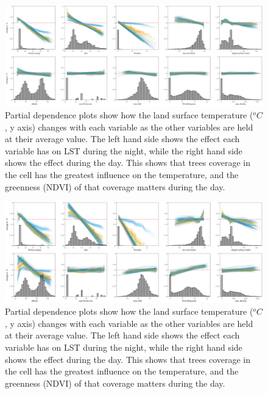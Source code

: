 \documentclass[final,3p,times,twocolumn,sort&compress]{elsarticle}
\begin{document}
\begin{figure}
    \centering
    \includegraphics[width=\linewidth]{fig/report/pdp_uncert_night_500.png}
    \caption{
    Partial dependence plots show how the land surface temperature ($^oC$, y axis) changes with each variable as the other variables are held at their average value. The left hand side shows the effect each variable has on LST during the night, while the right hand side shows the effect during the day. This shows that trees coverage in the cell has the greatest influence on the temperature, and the greenness (NDVI) of that coverage matters during the day.
    }
    \label{fig:pdp_night}
\end{figure}

\begin{figure}
    \centering
    \includegraphics[width=\linewidth]{fig/report/pdp_uncert_day_500.png}
    \caption{
    Partial dependence plots show how the land surface temperature ($^oC$, y axis) changes with each variable as the other variables are held at their average value. The left hand side shows the effect each variable has on LST during the night, while the right hand side shows the effect during the day. This shows that trees coverage in the cell has the greatest influence on the temperature, and the greenness (NDVI) of that coverage matters during the day.
    }
    \label{fig:pdp_day}
\end{figure}
\end{document}
